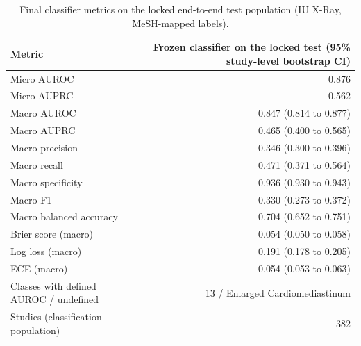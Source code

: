 \begin{table}[t]
\centering
\scriptsize
\begin{tabular}{lr}
\hline
Metric & Frozen classifier on the locked test (95\% study-level bootstrap CI) \\
\hline
Micro AUROC & 0.876 \\
Micro AUPRC & 0.562 \\
Macro AUROC & 0.847 (0.814 to 0.877) \\
Macro AUPRC & 0.465 (0.400 to 0.565) \\
Macro precision & 0.346 (0.300 to 0.396) \\
Macro recall & 0.471 (0.371 to 0.564) \\
Macro specificity & 0.936 (0.930 to 0.943) \\
Macro F1 & 0.330 (0.273 to 0.372) \\
Macro balanced accuracy & 0.704 (0.652 to 0.751) \\
Brier score (macro) & 0.054 (0.050 to 0.058) \\
Log loss (macro) & 0.191 (0.178 to 0.205) \\
ECE (macro) & 0.054 (0.053 to 0.063) \\
Classes with defined AUROC / undefined & 13 / Enlarged Cardiomediastinum \\
Studies (classification population) & 382 \\
\hline
\end{tabular}
\caption{Final classifier metrics on the locked end-to-end test population (IU X-Ray, MeSH-mapped labels).}
\label{tab:table2_final_classifier_metrics}
\end{table}
